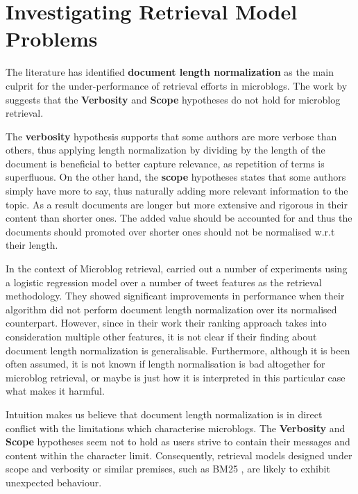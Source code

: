 \section{Investigating Retrieval Model Problems}
The literature has identified \textbf{document length normalization} as the main culprit for the under-performance of retrieval efforts in microblogs. The work by \cite{naveed2011searching} suggests that the \textbf{Verbosity} and \textbf{Scope} hypotheses do not hold for microblog retrieval.

The \textbf{verbosity} hypothesis supports that some authors are more verbose than others, thus applying length normalization by dividing by the length of the document is beneficial to better capture relevance, as repetition of terms is superfluous. On the other hand, the \textbf{scope} hypotheses states that some authors simply have more to say, thus naturally adding more relevant information to the topic. As a result documents are longer but more extensive and rigorous in their content than shorter ones. The added value should be accounted for and thus the documents should promoted over shorter ones should not be normalised w.r.t their length.

In the context of Microblog retrieval, \cite{naveed2011searching} carried out a number of experiments using a logistic regression model over a number of tweet features as the retrieval methodology. They showed significant improvements in performance when their algorithm did not perform document length normalization over its normalised counterpart. However, since in their work their ranking approach takes into consideration multiple other features, it is not clear if their finding about document length normalization is generalisable. Furthermore, although it is been often assumed, it is not known if length normalisation is bad altogether for microblog retrieval, or maybe is just how it is interpreted in this particular case what makes it harmful.

Intuition makes us believe that document length normalization is in direct conflict with the limitations which characterise microblogs. The \textbf{Verbosity} and \textbf{Scope} hypotheses seem not to hold as users strive to contain their messages and content within the character limit. Consequently, retrieval models designed under scope and verbosity or similar premises, such as BM25 \cite{robertson2009probabilistic}, are likely to exhibit unexpected behaviour.

